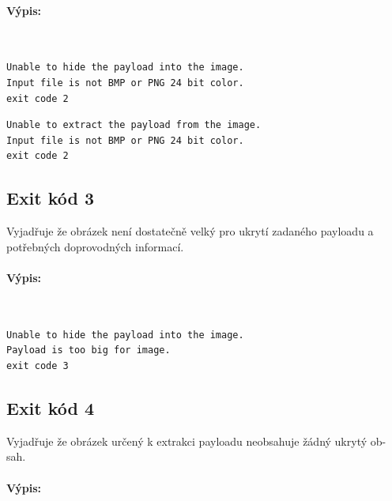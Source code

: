 \documentclass[12pt]{report}
\begin{document}
    \paragraph{Výpis:}\\

    \begin{mdframed}
        \begin{verbatim}
Unable to hide the payload into the image.
Input file is not BMP or PNG 24 bit color.
exit code 2
        \end{verbatim}
    \end{mdframed}

    \begin{mdframed}
        \begin{verbatim}
Unable to extract the payload from the image.
Input file is not BMP or PNG 24 bit color.
exit code 2
        \end{verbatim}
    \end{mdframed}

    \subsection{Exit kód 3}
    Vyjadřuje že obrázek není dostatečně velký pro ukrytí zadaného payloadu a
    potřebných doprovodných informací.

    \paragraph{Výpis:}\\

    \begin{mdframed}
        \begin{verbatim}
Unable to hide the payload into the image.
Payload is too big for image.
exit code 3
        \end{verbatim}
    \end{mdframed}

    \subsection{Exit kód 4}
    Vyjadřuje že obrázek určený k extrakci payloadu neobsahuje žádný ukrytý ob-
    sah.\\

    \paragraph{Výpis:}\\
\end{document}
